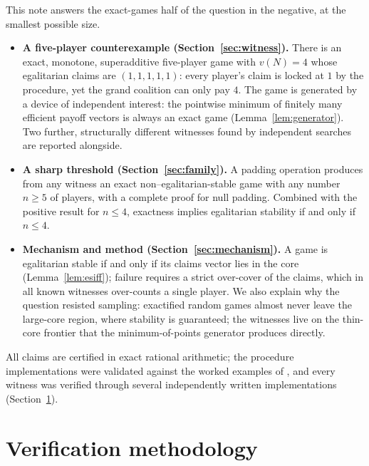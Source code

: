 \documentclass[11pt]{article}
\begin{document}
This note answers the exact-games half of the question in the negative, at
the smallest possible size.

\begin{itemize}[leftmargin=2em]
\item \textbf{A five-player counterexample (Section~\ref{sec:witness}).}
There is an exact, monotone, superadditive five-player game with
$v(N)=4$ whose egalitarian claims are $(1,1,1,1,1)$: every player's claim is
locked at $1$ by the procedure, yet the grand coalition can only pay $4$.
The game is generated by a device of independent interest: the pointwise
minimum of finitely many efficient payoff vectors is always an exact game
(Lemma~\ref{lem:generator}). Two further, structurally different witnesses
found by independent searches are reported alongside.
\item \textbf{A sharp threshold (Section~\ref{sec:family}).} A padding
operation produces from any witness an exact non--egalitarian-stable game
with any number $n\ge5$ of players, with a complete proof for null padding.
Combined with the positive result for $n\le4$, exactness implies egalitarian
stability if and only if $n\le 4$.
\item \textbf{Mechanism and method (Section~\ref{sec:mechanism}).} A game is
egalitarian stable if and only if its claims vector lies in the core
(Lemma~\ref{lem:esiff}); failure requires a strict over-cover of the claims,
which in all known witnesses over-counts a single player. We also explain
why the question resisted sampling: exactified random games almost never
leave the large-core region, where stability is guaranteed; the witnesses
live on the thin-core frontier that the minimum-of-points generator
produces directly.
\end{itemize}

All claims are certified in exact rational arithmetic; the procedure
implementations were validated against the worked examples of
\citet{Dietzenbacher2021}, and every witness was verified through several
independently written implementations
(Section~\ref{sec:methods}).



\section{Verification methodology}\label{sec:methods}
\end{document}
